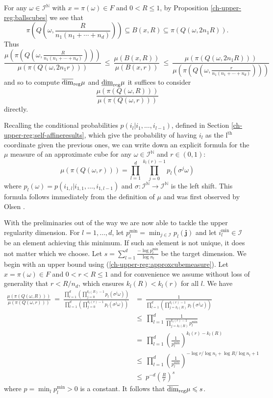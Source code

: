 For any $\omega \in \mathcal{I}^{\mathbb{N}}$ with $x= \pi(\omega) \in F$ and $0<R\le 1$, by Proposition \ref{ch-upper-reg:ballscubes} we see that
\[
\pi(Q(\omega, \frac{R}{n_1(n_1+ \cdots + n_d)}))  \subseteq B(x,R) \subseteq \pi (Q(\omega,2 n_1 R)).
\]
Thus
\[
\frac{\mu \left(\pi \left(Q\left(\omega,\frac{R}{n_1(n_1+ \cdots + n_d)}\right)\right)\right)} {\mu(\pi(Q(\omega,2n_1 r)))} \ \leq \  \frac{\mu(B(x,R))}{\mu(B(x,r))}  \ \leq \ \frac{\mu(\pi(Q(\omega,2n_1 R)))}{\mu \left(\pi \left(Q\left(\omega,\frac{r}{n_1(n_1+ \cdots + n_d)}\right)\right)\right)}
\]
and so to compute $\overline{\dim}_{\textup{reg}} \mu$ and $\underline{\dim}_{\textup{reg}} \mu$ it suffices to consider 
\[
\frac{\mu(\pi(Q(\omega,R)))}{\mu(\pi(Q(\omega,r)))} 
\]
directly. 


Recalling the conditional probabilities $p(i_{l}\vert i_{1},\ldots,i_{l-1})$, defined in Section \ref{ch-upper-reg:self-affineresults}, which give the probability of having $i_{l}$ as the $\text{l}^{\text{th}}$ coordinate given the previous ones, we can write down an explicit formula for the $\mu $ measure of an approximate cube for any $\omega \in \mathcal{I}^{\mathbb{N}}$ and $r \in (0,1)$:
\begin{equation} \label{ch-upper-reg:approxcubemeasure}
\mu(\pi(Q(\omega,r)))=\prod^d_{l=1} \prod_{j=0}^{k_l(r)-1}p_l(\sigma^j\omega)
\end{equation}
where $p_l(\omega)=p(i_{1,l}\vert i_{1,1},\ldots,i_{1,l-1})$ and $\sigma: \mathcal{I}^{\mathbb{N}} \to \mathcal{I}^{\mathbb{N}}$ is the left shift.  This formula follows immediately from the definition of $\mu$ and was first observed by Olsen \cite[(6.2)]{sponges}.

With the preliminaries out of the way we are now able to tackle the upper regularity dimension. For $l=1,\ldots, d$, let $p_l^{\text{min}}=\min_{j\in \mathcal{I}} p_l(\mathbf{j})$  and let  $i_l^{\min} \in \mathcal{I}$ be an element achieving this minimum.  If such an element is not unique, it does not matter which we choose. Let $s=\sum_{l=1}^d\frac{-\log p_l^{\text{min}}}{\log n_l}$ be the target dimension. We begin with an upper bound using (\ref{ch-upper-reg:approxcubemeasure}). Let $x = \pi(\omega ) \in F$ and $0< r < R\le 1$ and for convenience we assume without loss of generality that $r < R/ n_d$, which ensures $k_l(R) < k_l(r)$ for all $l$.  We have
\begin{align*}
\frac{\mu(\pi(Q(\omega,R)))}{\mu(\pi(Q(\omega,r)))} \ = \ \frac{\prod_{l=1}^d\left(\prod_{j=0}^{k_l(R)-1}p_l(\sigma^j \omega) \right)}{\prod_{l=1}^d\left(\prod_{j=0}^{k_l(r)-1}p_l(\sigma^j \omega) \right)}  & = \ \frac{1}{\prod_{l=1}^d\left(\prod_{j=k_l(R)}^{k_l(r)-1}p_l(\sigma^j \omega) \right)} \\
& \le\  \prod_{l=1}^d \frac{1}{\prod_{j=k_l(R)}^{k_l(r)-1}p_l^{\text{min}}} \\
& =\  \prod_{l=1}^d\left( \frac{1}{p_l^{\text{min}}}\right)^{k_l(r)-k_l(R)} \\
& \le\  \prod_{l=1}^d \left( \frac{1}{p_l^{\text{min}}}\right)^{-\log r/\log n_l + \log R/\log n_l + 1}  \\
& \le \ p^{-d} \left( \frac{R}{r} \right)^{s}
\end{align*}
where $p = \min_l p_l^{\text{min}}>0$ is a constant. It follows that $\overline{\dim}_{\textup{reg}} \mu \leqslant s$.

